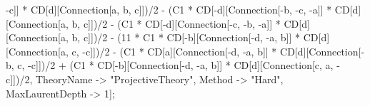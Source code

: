 -c]] * CD[d][Connection[a, b, c]])/2 - (C1 * CD[-d][Connection[-b, -c, -a]] * CD[d][Connection[a, b, c]])/2 - (C1 * CD[-d][Connection[-c, -b, -a]] * CD[d][Connection[a, b, c]])/2 - (11 * C1 * CD[-b][Connection[-d, -a, b]] * CD[d][Connection[a, c, -c]])/2 - (C1 * CD[a][Connection[-d, -a, b]] * CD[d][Connection[-b, c, -c]])/2 + (C1 * CD[-b][Connection[-d, -a, b]] * CD[d][Connection[c, a, -c]])/2, TheoryName -> "ProjectiveTheory", Method -> "Hard", MaxLaurentDepth -> 1]; 